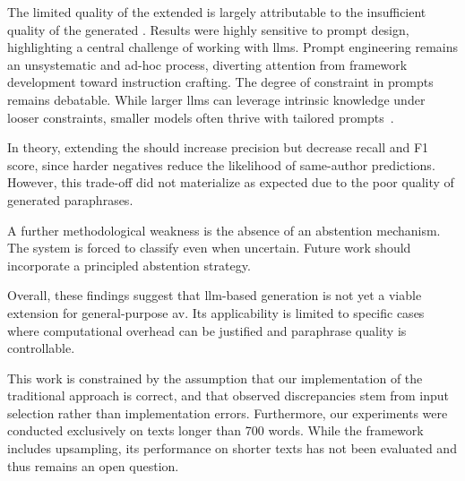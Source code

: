 The limited quality of the extended \impAppr{} is largely attributable to the insufficient quality of the generated \imps{}. 
Results were highly sensitive to prompt design, highlighting a central challenge of working with \acp{llm}. 
Prompt engineering remains an unsystematic and ad-hoc process, diverting attention from framework development toward instruction crafting. 
The degree of constraint in prompts remains debatable. 
While larger \acp{llm} can leverage intrinsic knowledge under looser constraints, smaller models often thrive with tailored prompts~\citep{schmidt_llm_av_latin_24}. 

In theory, extending the \impAppr{} should increase precision but decrease recall and F1 score, since harder negatives reduce the likelihood of same-author predictions. 
However, this trade-off did not materialize as expected due to the poor quality of generated paraphrases.

A further methodological weakness is the absence of an abstention mechanism. 
The system is forced to classify even when uncertain. 
Future work should incorporate a principled abstention strategy.

Overall, these findings suggest that \ac{llm}-based \imp{} generation is not yet a viable extension for general-purpose \ac{av}. 
Its applicability is limited to specific cases where computational overhead can be justified and paraphrase quality is controllable.

This work is constrained by the assumption that our implementation of the traditional approach is correct, and that observed discrepancies stem from input selection rather than implementation errors. 
Furthermore, our experiments were conducted exclusively on texts longer than 700 words. 
While the framework includes upsampling, its performance on shorter texts has not been evaluated and thus remains an open question.
